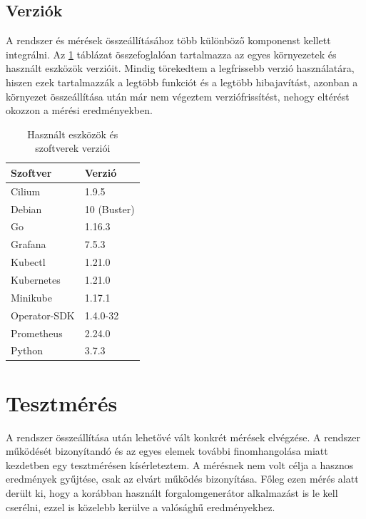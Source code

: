 
\subsection{Verziók}
A rendszer és mérések összeállításához több különböző komponenst kellett integrálni.
Az \ref{tab:versions} táblázat összefoglalóan tartalmazza az egyes környezetek és használt eszközök verzióit. 
Mindig törekedtem a legfrissebb verzió használatára, hiszen ezek tartalmazzák a legtöbb funkciót és a legtöbb hibajavítást, azonban a környezet összeállítása után már nem végeztem verziófrissítést, nehogy eltérést okozzon a mérési eredményekben.

\begin{table}[ht]
\centering
  \begin{tabular}{l l}
	  Szoftver 		& Verzió \\
    \hline
	  Cilium 		& 1.9.5 \\
      Debian 		& 10 (Buster)  \\ 
      Go 			& 1.16.3 \\ 
      Grafana 		& 7.5.3 \\ 
      Kubectl 		& 1.21.0 \\
      Kubernetes 	& 1.21.0 \\ 
      Minikube		& 1.17.1 \\
      Operator-SDK 	& 1.4.0-32 \\ 
      Prometheus 	& 2.24.0 \\ 
      Python 		& 3.7.3 \\ 
  \end{tabular}
  
  \caption{Használt eszközök és szoftverek verziói}
\label{tab:versions}
\end{table}


\section{Tesztmérés}
A rendszer összeállítása után lehetővé vált konkrét mérések elvégzése.
A rendszer működését bizonyítandó és az egyes elemek további finomhangolása miatt kezdetben egy tesztmérésen kísérleteztem.
A mérésnek nem volt célja a hasznos eredmények gyűjtése, csak az elvárt működés bizonyítása. 
Főleg ezen mérés alatt derült ki, hogy a korábban használt forgalomgenerátor alkalmazást is le kell cserélni, ezzel is közelebb kerülve a valósághű eredményekhez.

